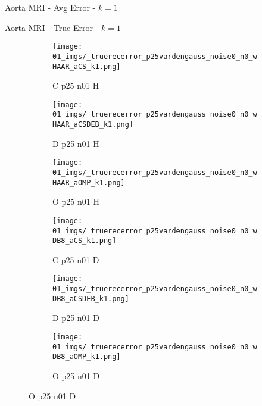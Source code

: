 \begin{frame}{Aorta MRI - Avg Error - $k=1$}{}
\begin{figure}
\end{figure}
\end{frame}


\begin{frame}{Aorta MRI - True Error - $k=1$}{}
\begin{figure}
\begin{subfigure}{0.13\textwidth}
\texttt{[image: 01\_imgs/\_truerecerror\_p25vardengauss\_noise0\_n0\_wHAAR\_aCS\_k1.png]}
\caption*{\tiny C p25 n01 H}
\end{subfigure}
\begin{subfigure}{0.13\textwidth}
\texttt{[image: 01\_imgs/\_truerecerror\_p25vardengauss\_noise0\_n0\_wHAAR\_aCSDEB\_k1.png]}
\caption*{\tiny D p25 n01 H}
\end{subfigure}
\begin{subfigure}{0.13\textwidth}
\texttt{[image: 01\_imgs/\_truerecerror\_p25vardengauss\_noise0\_n0\_wHAAR\_aOMP\_k1.png]}
\caption*{\tiny O p25 n01 H}
\end{subfigure}
\begin{subfigure}{0.13\textwidth}
\texttt{[image: 01\_imgs/\_truerecerror\_p25vardengauss\_noise0\_n0\_wDB8\_aCS\_k1.png]}
\caption*{\tiny C p25 n01 D}
\end{subfigure}
\begin{subfigure}{0.13\textwidth}
\texttt{[image: 01\_imgs/\_truerecerror\_p25vardengauss\_noise0\_n0\_wDB8\_aCSDEB\_k1.png]}
\caption*{\tiny D p25 n01 D}
\end{subfigure}
\begin{subfigure}{0.13\textwidth}
\texttt{[image: 01\_imgs/\_truerecerror\_p25vardengauss\_noise0\_n0\_wDB8\_aOMP\_k1.png]}
\caption*{\tiny O p25 n01 D}
\end{subfigure}

\vspace{5pt}


\end{figure}
\end{frame}
